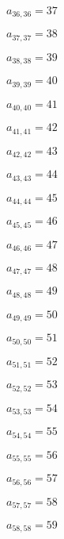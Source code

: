 \documentclass[a4paper,12pt]{article}
\begin{document}
$a _{ 36, 36 } = 37$

$a _{ 37, 37 } = 38$

$a _{ 38, 38 } = 39$

$a _{ 39, 39 } = 40$

$a _{ 40, 40 } = 41$

$a _{ 41, 41 } = 42$

$a _{ 42, 42 } = 43$

$a _{ 43, 43 } = 44$

$a _{ 44, 44 } = 45$

$a _{ 45, 45 } = 46$

$a _{ 46, 46 } = 47$

$a _{ 47, 47 } = 48$

$a _{ 48, 48 } = 49$

$a _{ 49, 49 } = 50$

$a _{ 50, 50 } = 51$

$a _{ 51, 51 } = 52$

$a _{ 52, 52 } = 53$

$a _{ 53, 53 } = 54$

$a _{ 54, 54 } = 55$

$a _{ 55, 55 } = 56$

$a _{ 56, 56 } = 57$

$a _{ 57, 57 } = 58$

$a _{ 58, 58 } = 59$
\end{document}
